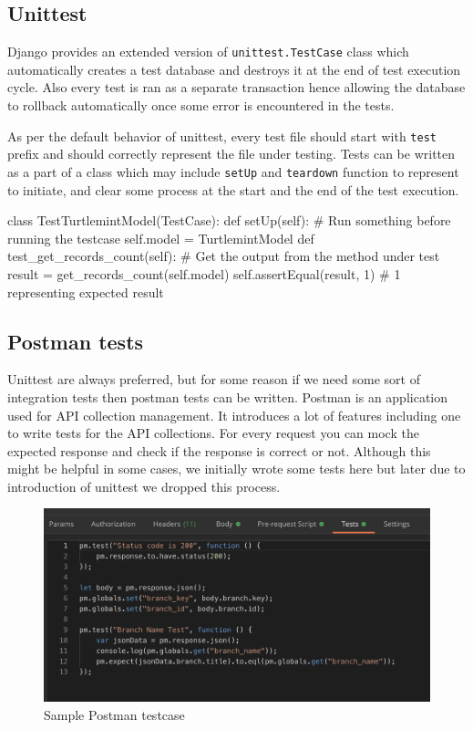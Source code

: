 \subsection{Unittest}
Django provides an extended version of \texttt{unittest.TestCase} class which
automatically creates a test database and destroys it at the end of test
execution cycle. Also every test is ran as a separate transaction hence
allowing the database to rollback automatically once some error is encountered
in the tests.

As per the default behavior of unittest, every test file should start with
\texttt{test} prefix and should correctly represent the file under testing.
Tests can be written as a part of a class which may include \texttt{setUp}
and \texttt{teardown} function to represent to initiate, and clear some process
at the start and the end of the test execution.

\begin{pythoncode}
class TestTurtlemintModel(TestCase):
    def setUp(self):
        # Run something before running the testcase
        self.model = TurtlemintModel
    def test_get_records_count(self):
        # Get the output from the method under test
        result = get_records_count(self.model)
        self.assertEqual(result, 1) # 1 representing expected result
\end{pythoncode}

\subsection{Postman tests}
Unittest are always preferred, but for some reason if we need some sort of
integration tests then postman tests can be written. Postman is an application
used for API collection management. It introduces a lot of features including
one to write tests for the API collections. For every request you can mock
the expected response and check if the response is correct or not. Although
this might be helpful in some cases, we initially wrote some tests here but
later due to introduction of unittest we dropped this process.

\begin{figure}
\includegraphics[width=\textwidth]{ch4/postman_test.png}
\caption{Sample Postman testcase}
\end{figure}
